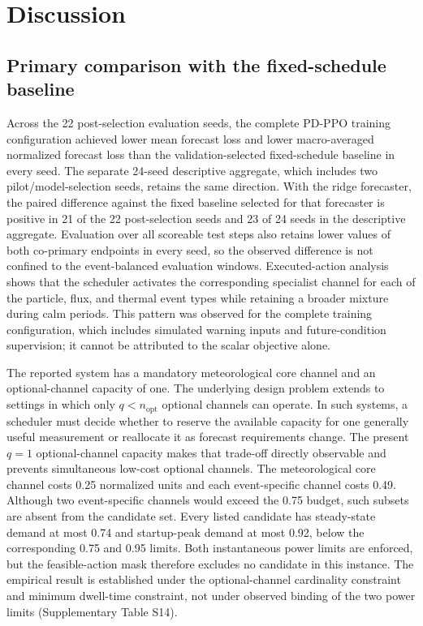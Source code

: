\section{Discussion}
\label{sec:discussion_future_work}

\subsection{Primary comparison with the fixed-schedule baseline}

Across the 22 post-selection evaluation seeds, the complete PD-PPO training
configuration achieved lower mean forecast loss and lower macro-averaged
normalized forecast loss than the validation-selected fixed-schedule baseline in
every seed. The separate 24-seed descriptive
aggregate, which includes two pilot/model-selection seeds, retains the same
direction. With the ridge forecaster, the paired difference against the fixed
baseline selected for that forecaster is positive in 21 of the 22 post-selection
seeds and 23 of 24 seeds in the descriptive aggregate. Evaluation over all
scoreable test steps also
retains lower values of both co-primary endpoints in every seed, so the observed
difference is not confined to the event-balanced evaluation windows.
Executed-action analysis shows that the scheduler activates the corresponding
specialist channel for each of the particle, flux, and thermal event types while
retaining a broader mixture during calm periods. This pattern was observed for
the complete training configuration, which includes simulated warning inputs and
future-condition supervision; it cannot be attributed to the scalar objective
alone.

The reported system has a mandatory meteorological core channel and an optional-channel
capacity of one. The underlying design problem extends to settings in which only
$q<n_{\mathrm{opt}}$ optional
channels can operate. In such systems, a scheduler must decide whether to
reserve the available capacity for one generally useful measurement or
reallocate it as forecast requirements change. The present $q=1$ optional-channel capacity makes that trade-off directly observable and
prevents simultaneous low-cost optional channels. The meteorological core channel
costs 0.25 normalized units and each event-specific channel costs 0.49. Although
two event-specific channels would exceed the 0.75 budget, such subsets are absent
from the candidate set. Every listed candidate has steady-state demand at most
0.74 and startup-peak demand at most 0.92, below the corresponding 0.75 and 0.95
limits. Both instantaneous power limits are enforced, but the feasible-action
mask therefore excludes no candidate in this instance. The empirical result is
established under the optional-channel cardinality constraint and minimum
dwell-time constraint, not under observed binding of the two power limits
(Supplementary Table S14).

